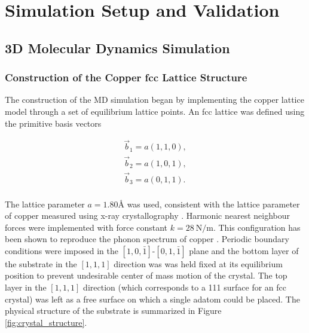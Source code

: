 \chapter{Simulation Setup and Validation} \label{ch:sim_setup} 

\section{3D Molecular Dynamics Simulation} \label{sec:md_setup}

\subsection{Construction of the Copper fcc Lattice Structure}

The construction of the MD simulation began by implementing the copper lattice model through a set of equilibrium lattice points. An fcc lattice was defined using the primitive basis vectors

\begin{align}
	\vec{b}_1 = a\left(1,1,0\right), \nonumber \\
	\vec{b}_2 = a\left(1,0,1\right), \label{eq:primitive_basis_vectors} \\
	\vec{b}_3 = a\left(0,1,1\right). \nonumber
\end{align}
\\
The lattice parameter $a=1.80\si{\angstrom}$ was used, consistent with the lattice parameter of copper measured using x-ray crystallography \cite{davey}.
Harmonic nearest neighbour forces were implemented with force constant $k=\SI{28}{\newton\per\metre}$. This configuration has been shown to reproduce the phonon spectrum of copper \cite{sinha}. Periodic boundary conditions were imposed in the $\left[1,0,\bar{1}\right]$-$\left[0,1,\bar{1}\right]$ plane and the bottom layer of the substrate in the $\left[1,1,1\right]$ direction was was held fixed at its equilibrium position to prevent undesirable center of mass motion of the crystal. The top layer in the $\left[1,1,1\right]$ direction (which corresponds to a 111 surface for an fcc crystal) was left as a free surface on which a single adatom could be placed. The physical structure of the substrate is summarized in Figure \ref{fig:crystal_structure}.

